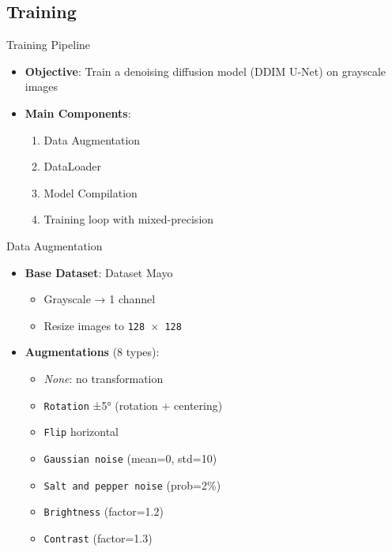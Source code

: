 \subsection{Training}
\begin{frame}{Training Pipeline}
    \begin{itemize}
        \item \textbf{Objective}: Train a denoising diffusion model (DDIM U-Net) on grayscale images
        \item \textbf{Main Components}:
              \begin{enumerate}
                  \item Data Augmentation
                  \item DataLoader
                  \item Model Compilation
                  \item Training loop with mixed-precision
              \end{enumerate}
    \end{itemize}
\end{frame}

\begin{frame}{Data Augmentation}
    \begin{itemize}
        \item \textbf{Base Dataset}: Dataset Mayo
              \begin{itemize}
                  \item Grayscale → 1 channel
                  \item Resize images to \texttt{128 $\times$ 128}
              \end{itemize}
        \item \textbf{Augmentations} (8 types):
              \begin{itemize}
                  \item \emph{None}: no transformation
                  \item \texttt{Rotation} ±5° (rotation + centering)
                  \item \texttt{Flip} horizontal
                  \item \texttt{Gaussian noise} (mean=0, std=10)
                  \item \texttt{Salt and pepper noise} (prob=2\%)
                  \item \texttt{Brightness} (factor=1.2)
                  \item \texttt{Contrast} (factor=1.3)
              \end{itemize}
    \end{itemize}
\end{frame}

